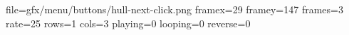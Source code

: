 file=gfx/menu/buttons/hull-next-click.png
framex=29
framey=147
frames=3
rate=25
rows=1
cols=3
playing=0
looping=0
reverse=0